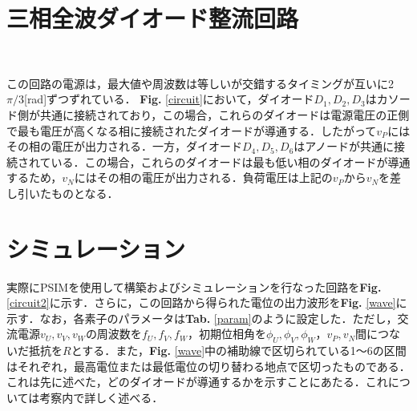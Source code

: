 \documentclass[a4paper,12pt]{jarticle}
\begin{document}
\section{三相全波ダイオード整流回路}　%



この回路の電源は，最大値や周波数は等しいが交錯するタイミングが互いに2$\pi/3$[rad]ずつずれている．
{\bf Fig. }\ref{circuit}において，ダイオード$D_1,D_2,D_3$はカソード側が共通に接続されており，この場合，これらのダイオードは電源電圧の正側で最も電圧が高くなる相に接続されたダイオードが導通する．したがって$v_P$にはその相の電圧が出力される．一方，ダイオード$D_4,D_5,D_6$はアノードが共通に接続されている．この場合，これらのダイオードは最も低い相のダイオードが導通するため，$v_N$にはその相の電圧が出力される．負荷電圧は上記の$v_P$から$v_N$を差し引いたものとなる．




\section{シミュレーション}
実際にPSIMを使用して構築およびシミュレーションを行なった回路を{\bf Fig. }\ref{circuit2}に示す．さらに，この回路から得られた電位の出力波形を{\bf Fig. }\ref{wave}に示す．なお，各素子のパラメータは{\bf Tab. }\ref{param}のように設定した．ただし，交流電源$v_U, v_V, v_W$の周波数を$f_U,f_V,f_W$，初期位相角を$\phi_U, \phi_V, \phi_W$，$v_P,v_N$間につないだ抵抗を$R$とする．また，{\bf Fig. }\ref{wave}中の補助線で区切られている1〜6の区間はそれぞれ，最高電位または最低電位の切り替わる地点で区切ったものである．これは先に述べた，どのダイオードが導通するかを示すことにあたる．これについては考察内で詳しく述べる．
\\
\end{document}
